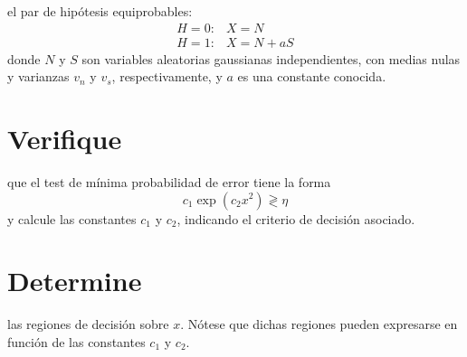 \ifspanish

 el par de hipótesis equiprobables:
$$ \begin{array}{ll} 
					  H=0:  & X = N \\
					  H=1:  & X = N + a S				  
					   \end{array}$$
donde $N$ y $S$ son variables aleatorias gaussianas independientes, con medias nulas y varianzas $v_n$ y $v_s$, respectivamente, y $a$ es una constante conocida.
\begin{parts}
\part {Verifique} que el test de mínima probabilidad de error tiene la forma
$$c_1 \exp \left( c_2x^2 \right) \gtrless \eta$$
y {calcule} las constantes $c_1$ y $c_2$, indicando el criterio de decisión asociado.
\part {Determine} las regiones de decisión sobre $x$. Nótese que dichas regiones pueden expresarse en función de las constantes $c_1$ y $c_2$.
\end{parts}

\begin{solution}
\end{solution}

\else

